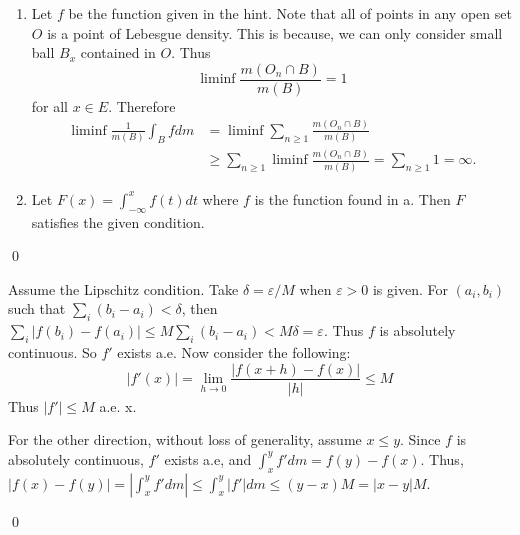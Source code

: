 \begin{exercise}[3.25] \hfill
	\begin{enumerate}[label = (\alph*)]
		\item Let $f$ be the function given in the hint.
			Note that all of points in any open set $O$ is a point of Lebesgue density.
			This is because, we can only consider small ball $B_x$ contained in $O$.
			Thus
			\[
				\liminf \frac{m(O_n \cap B)}{m(B)} = 1
			\]
			for all $x \in E$.
			Therefore
			\[
				\begin{split}
					\liminf \frac{1}{m(B)}\int_B f dm
					&= \liminf \sum_{n\ge 1}\frac{m(O_n \cap B)}{m(B)} \\
					&\ge \sum_{n \ge 1} \liminf \frac{m(O_n \cap B)}{m(B)} = \sum_{n\ge 1} 1 = \infty.
				\end{split}
			\]
			 
		\item Let $F(x) = \int_{-\infty}^x f(t) dt$ where $f$ is the function found in a.
			Then $F$ satisfies the given condition.
	\end{enumerate}
	\qed
\end{exercise}
\begin{exercise}[3.32] \hfill
	
	Assume the Lipschitz condition. Take $\delta = \varepsilon /M$ when $\varepsilon>0$ is given.
	For $(a_i, b_i)$ such that $\sum_i (b_i - a_i) < \delta$,
	then $\sum_i |f(b_i) - f(a_i)| \leq M\sum_i (b_i - a_i) < M \delta = \varepsilon$.
	Thus $f$ is absolutely continuous. So $f'$ exists a.e.
	Now consider the following:
	\[
		|f'(x)| = \lim_{h\rightarrow 0} \frac{|f(x+h)-f(x)|}{|h|} \leq M
	\]
	Thus $|f'| \leq M$ a.e. x.

	For the other direction, without loss of generality, assume $x\leq y$.
	Since $f$ is absolutely continuous, $f'$ exists a.e, and $\int_x^y f' dm = f(y) - f(x)$.
	Thus, $|f(x) - f(y) | = \left | \int_x^y f' dm \right | \leq \int_x^y |f'| dm \leq (y-x)M = |x-y|M$.

\qed
\end{exercise}

